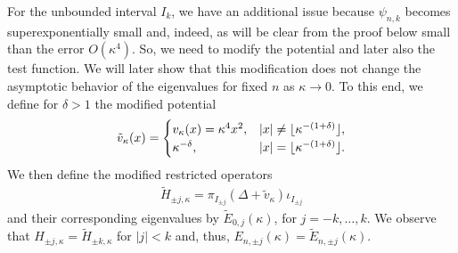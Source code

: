 \documentclass[12pt, reqno]{amsart}
\theoremstyle{definition}
\newtheorem*{remark}{Remark}
\numberwithin{equation}{section}
\DeclarePairedDelimiter\floor{\lfloor}{\rfloor}
\begin{document}


For the unbounded interval $I_k$, we have an additional issue because $\psi_{n,k}$ becomes superexponentially small and, indeed, as will be clear from the proof below small than the error $O(\kappa^4)$. So, we need to modify the potential and later also the test function. We will later show that this modification does not change the asymptotic behavior of the eigenvalues for fixed $n$ as $\kappa\to 0$.
To this end, we define for $\delta>1$ the modified potential
$$
\tilde v_{\kappa}(x)=\begin{cases} v_{\kappa}(x)=\kappa^4 x^2, & |x|\neq \floor{\kappa^{-(1+\delta)}},\\
 \kappa^{-\delta}, & |x|=\floor{\kappa^{-(1+\delta)}} .
\end{cases}
 $$
We then define the modified restricted operators
	\begin{align*}
		\tilde H_{  \pm j,\kappa}   = \pi_{I_{ \pm j}} (\Delta + \tilde v_{\kappa})\iota_{I_{ \pm j}}
	\end{align*}
	and their corresponding eigenvalues by $\tilde E_{0,j}(\kappa)$, for $j = -k,\dots , k$. We observe that $ H_{\pm j,\kappa}=\tilde H_{\pm k,\kappa}$ for $|j|< k$ and, thus, $ E_{n,\pm j}(\kappa)=\tilde E_{n,\pm j}(\kappa)$. 
\end{document}
